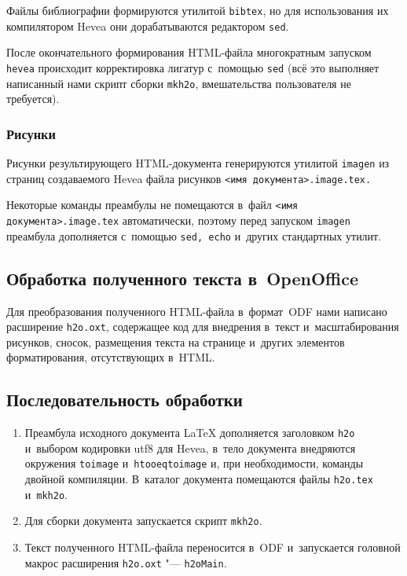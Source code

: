 \documentclass[10pt, a5paper]{article}
\begin{document}
Файлы библиографии %
формируются утилитой \verb!bibtex!, но для использования их компилятором Hevea они дорабатываются редактором \texttt{sed}.

После окончательного формирования HTML-файла многократным запуском \texttt{hevea} происходит корректировка лигатур с~помощью \texttt{sed}
(всё это выполняет написанный нами скрипт сборки \texttt{mkh2o}, вмешательства пользователя не требуется).

\subsubsection*{Рисунки}
Рисунки результирующего HTML-документа генерируются утилитой \texttt{imagen} из страниц создаваемого Hevea файла рисунков \texttt{<имя документа>.image.tex.}

Некоторые команды преамбулы не помещаются в~файл \texttt{<имя документа>.image.tex} автоматически, поэтому перед запуском  \texttt{imagen} преамбула дополняется с~помощью \texttt{sed, echo} и~других стандартных утилит.


\subsection*{Обработка полученного текста в~OpenOffice}

Для преобразования полученного HTML-файла в~формат~ODF нами написано расширение \texttt{h2o.oxt},
содержащее код для внедрения в~текст и~масштабирования рисунков, сносок, размещения текста на странице и~других элементов форматирования, отсутствующих в~HTML.

\subsection*{Последовательность обработки}

\begin{enumerate}
\item Преамбула исходного документа \LaTeX{} дополняется заголовком \texttt{h2o} и~выбором кодировки utf8 для Hevea,
в~тело документа внедряются окружения \texttt{toimage} и~\texttt{htooeqtoimage} и, при необходимости, команды двойной компиляции.
В~каталог документа помещаются файлы  \texttt{h2o.tex} и~\texttt{mkh2o}.

\item Для сборки документа запускается скрипт \texttt{mkh2o}.

\item Текст полученного HTML-файла переносится в~ODF и~запускается головной макрос расширения \texttt{h2o.oxt} "--- \texttt{h2oMain}.
\end{enumerate}
\end{document}
